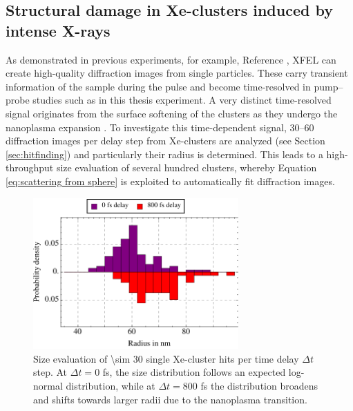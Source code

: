 \subsection{Structural damage in Xe-clusters induced by intense X-rays}\label{sec:xenon-data}
As demonstrated in previous experiments, for example, Reference \cite{Rupp-2012-NJP}, XFEL can create high-quality diffraction images from single particles. These carry transient information of the sample during the pulse \cite{Bostedt-2012-PRL} and become time-resolved in pump--probe studies \cite{Gorkhover-2016-NatPho} such as in this thesis experiment. A very distinct time-resolved signal originates from the surface softening of the clusters as they undergo the nanoplasma expansion \cite{Gorkhover-2016-NatPho}. To investigate this time-dependent signal, \numrange{30}{60} diffraction images per delay step from Xe-clusters are analyzed (see Section \ref{sec:hitfinding}) and particularly their radius is determined. This leads to a high-throughput size evaluation of several hundred clusters, whereby Equation \eqref{eq:scattering from sphere} is exploited to automatically fit diffraction images.\\[1\baselineskip]
\begin{figure}
	\centering
		\includegraphics[width=0.70\textwidth]{images/results/size-distributions.pdf}
	\caption[Single Xe-cluster size distribution at varying time delay $\Delta t$.]{Size evaluation of \num{\sim 30} single Xe-cluster hits per time delay $\Delta t$ step. At $\Delta t=0$ fs, the size distribution follows an expected log-normal distribution, while at $\Delta t=800$ fs the distribution broadens and shifts towards larger radii due to the nanoplasma transition.}
	\label{fig:size-distributions}
\end{figure}
